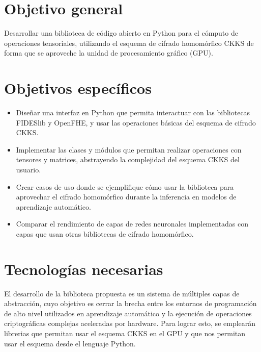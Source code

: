\section{Objetivo general}

Desarrollar una biblioteca de código abierto en Python para el cómputo de operaciones tensoriales, utilizando el esquema de cifrado homomórfico CKKS de forma que se aproveche la unidad de procesamiento gráfico (GPU).

\section{Objetivos específicos}

\begin{itemize}
    \item Diseñar una interfaz en Python que permita interactuar con las bibliotecas FIDESlib y OpenFHE, y usar las operaciones básicas del esquema de cifrado CKKS.
    \item Implementar las clases y módulos que permitan realizar operaciones con tensores y matrices, abstrayendo la complejidad del esquema CKKS del usuario.
    \item Crear casos de uso donde se ejemplifique cómo usar la biblioteca para aprovechar el cifrado homomórfico durante la inferencia en modelos de aprendizaje automático.
    \item Comparar el rendimiento de capas de redes neuronales implementadas con capas que usan otras bibliotecas de cifrado homomórfico.
\end{itemize}

\section{Tecnologías necesarias}

El desarrollo de la biblioteca propuesta es un sistema de múltiples capas de abstracción, cuyo objetivo es cerrar la brecha entre los entornos de programación de alto nivel utilizados en aprendizaje automático y la ejecución de operaciones criptográficas complejas aceleradas por hardware. Para lograr esto, se emplearán librerias que permitan usar el esquema CKKS en el GPU y que nos permitan usar el esquema desde el lenguaje Python.

